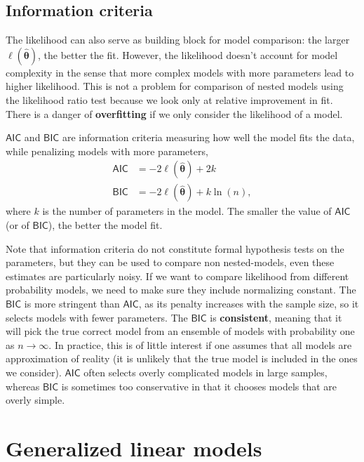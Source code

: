 \documentclass[
  11pt,
  letterpaper,
]{book}
\theoremstyle{definition}
\theoremstyle{definition}
\theoremstyle{definition}
\theoremstyle{remark}
\begin{document}
\hypertarget{information-criteria}{%
\section{Information criteria}\label{information-criteria}}

The likelihood can also serve as building block for model comparison: the larger \(\ell(\boldsymbol{\widehat{\theta}})\), the better the fit. However, the likelihood doesn't account for model complexity in the sense that more complex models with more parameters lead to higher likelihood. This is not a problem for comparison of nested models using the likelihood ratio test because we look only at relative improvement in fit. There is a danger of \textbf{overfitting} if we only consider the likelihood of a model.

\(\mathsf{AIC}\) and \(\mathsf{BIC}\) are information criteria measuring how well the model fits the data, while penalizing models with more parameters,
\begin{align*}
\mathsf{AIC}&=-2\ell(\widehat{\boldsymbol{\theta}})+2k \\
\mathsf{BIC}&=-2\ell(\widehat{\boldsymbol{\theta}})+k\ln(n),
\end{align*}
where \(k\) is the number of parameters in the model. The smaller the value of \(\mathsf{AIC}\) (or of \(\mathsf{BIC}\)), the better the model fit.

Note that information criteria do not constitute formal hypothesis tests on the parameters, but they can be used to compare non nested-models, even these estimates are particularly noisy. If we want to compare likelihood from different probability models, we need to make sure they include normalizing constant. The \(\mathsf{BIC}\) is more stringent than \(\mathsf{AIC}\), as its penalty increases with the sample size, so it selects models with fewer parameters. The \(\mathsf{BIC}\) is \textbf{consistent}, meaning that it will pick the true correct model from an ensemble of models with probability one as \(n \to \infty\). In practice, this is of little interest if one assumes that all models are approximation of reality (it is unlikely that the true model is included in the ones we consider). \(\mathsf{AIC}\) often selects overly complicated models in large samples, whereas \(\mathsf{BIC}\) is sometimes too conservative in that it chooses models that are overly simple.

\hypertarget{generalized-linear-models}{%
\chapter{Generalized linear models}\label{generalized-linear-models}}
\end{document}
